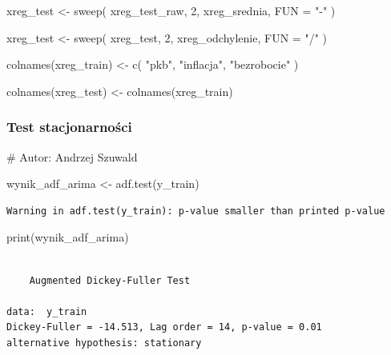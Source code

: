 \documentclass[
  polish,
  letterpaper,
  DIV=11,
  numbers=noendperiod]{scrartcl}
\newenvironment{Shaded}{\begin{snugshade}}{\end{snugshade}}
\newcommand{\AttributeTok}[1]{\textcolor[rgb]{0.40,0.45,0.13}{#1}}
\newcommand{\CommentTok}[1]{\textcolor[rgb]{0.37,0.37,0.37}{#1}}
\newcommand{\DecValTok}[1]{\textcolor[rgb]{0.68,0.00,0.00}{#1}}
\newcommand{\FunctionTok}[1]{\textcolor[rgb]{0.28,0.35,0.67}{#1}}
\newcommand{\NormalTok}[1]{\textcolor[rgb]{0.00,0.23,0.31}{#1}}
\newcommand{\OtherTok}[1]{\textcolor[rgb]{0.00,0.23,0.31}{#1}}
\newcommand{\StringTok}[1]{\textcolor[rgb]{0.13,0.47,0.30}{#1}}
\begin{document}
\begin{Shaded}
\begin{Highlighting}[]
\NormalTok{xreg\_test }\OtherTok{\textless{}{-}} \FunctionTok{sweep}\NormalTok{(}
\NormalTok{  xreg\_test\_raw,}
  \DecValTok{2}\NormalTok{,}
\NormalTok{  xreg\_srednia,}
  \AttributeTok{FUN =} \StringTok{"{-}"}
\NormalTok{)}

\NormalTok{xreg\_test }\OtherTok{\textless{}{-}} \FunctionTok{sweep}\NormalTok{(}
\NormalTok{  xreg\_test,}
  \DecValTok{2}\NormalTok{,}
\NormalTok{  xreg\_odchylenie,}
  \AttributeTok{FUN =} \StringTok{"/"}
\NormalTok{)}

\FunctionTok{colnames}\NormalTok{(xreg\_train) }\OtherTok{\textless{}{-}} \FunctionTok{c}\NormalTok{(}
  \StringTok{"pkb"}\NormalTok{,}
  \StringTok{"inflacja"}\NormalTok{,}
  \StringTok{"bezrobocie"}
\NormalTok{)}

\FunctionTok{colnames}\NormalTok{(xreg\_test) }\OtherTok{\textless{}{-}} \FunctionTok{colnames}\NormalTok{(xreg\_train)}
\end{Highlighting}
\end{Shaded}

\subsubsection{Test stacjonarności}\label{test-stacjonarnoux15bci}

\begin{Shaded}
\begin{Highlighting}[]
\CommentTok{\# Autor: Andrzej Szuwald}

\NormalTok{wynik\_adf\_arima }\OtherTok{\textless{}{-}} \FunctionTok{adf.test}\NormalTok{(y\_train)}
\end{Highlighting}
\end{Shaded}

\begin{verbatim}
Warning in adf.test(y_train): p-value smaller than printed p-value
\end{verbatim}

\begin{Shaded}
\begin{Highlighting}[]
\FunctionTok{print}\NormalTok{(wynik\_adf\_arima)}
\end{Highlighting}
\end{Shaded}

\begin{verbatim}

    Augmented Dickey-Fuller Test

data:  y_train
Dickey-Fuller = -14.513, Lag order = 14, p-value = 0.01
alternative hypothesis: stationary
\end{verbatim}
\end{document}
